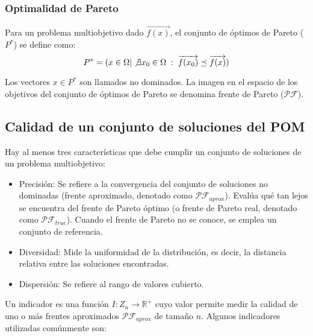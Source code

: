 \subsubsection{Optimalidad de Pareto}

Para un problema multiobjetivo dado $\overrightarrow{f(x)}$, el conjunto de óptimos de Pareto ($P^*$) se define como:
$$P^* = ( x \in \Omega | \not\exists x_0 \in \Omega \; : \; \overrightarrow{f(x_0)} \preceq \overrightarrow{f(x)})$$
 
Los vectores $x \in P^*$ son llamados no dominados. La imagen en el espacio de los objetivos del conjunto de óptimos de Pareto se denomina frente de Pareto ($\mathcal{PF}$).
 
 
\subsection{Calidad de un conjunto de soluciones del POM}
 
Hay al menos tres características que debe cumplir un conjunto de soluciones de un problema multiobjetivo:

\begin{itemize}
 \item Precisión: Se refiere a la convergencia del conjunto de soluciones no dominadas (frente aproximado, denotado como $\mathcal{PF}_{aprox}$). Evalúa qué tan lejos se encuentra del
frente de Pareto óptimo (o frente de Pareto real, denotado como $\mathcal{PF}_{true}$). Cuando el frente de Pareto no se conoce, se emplea un conjunto de referencia.

 \item Diversidad: Mide la uniformidad de la distribución, es decir, la distancia relativa entre las soluciones encontradas.

 \item Dispersión: Se refiere al rango de valores cubierto.
 
\end{itemize}

Un indicador es una función $I:Z_n \rightarrow \mathbb{R}^+$ cuyo valor permite medir la calidad de uno o más frentes aproximados $\mathcal{PF}_{aprox}$ de tamaño $n$. Algunos indicadores utilizadas comúnmente son:

